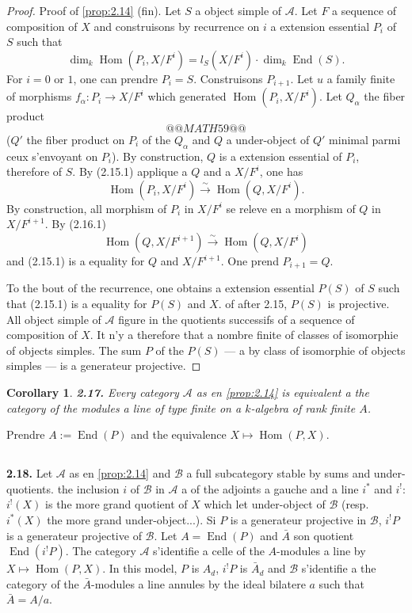 \documentclass[12pt,a4paper]{article}
\theoremstyle{plain}
\newtheorem{corollary}[theorem]{Corollary}
\theoremstyle{definition}
\theoremstyle{remark}
\DeclareMathOperator{\Hom}{Hom}
\DeclareMathOperator{\End}{End}
\begin{document}
\begin{proof}
Proof of \ref{prop:2.14} (fin). Let $S$ a object simple of $\mathcal{A}$. Let $F$ a sequence of composition of $X$ and construisons by recurrence on $i$ a extension essential $P_i$ of $S$ such that
\begin{equation}\label{eq:2.16.1}
\dim_k \Hom(P_i, X/F^i) = l_S(X/F^i) \cdot \dim_k \End(S).
\end{equation}
For $i = 0$ or $1$, one can prendre $P_i = S$. Construisons $P_{i+1}$. Let $u$ a family finite of morphisms $f_\alpha : P_i \to X/F^i$ which generated $\Hom(P_i, X/F^i)$. Let $Q_\alpha$ the fiber product
\[
@@MATH59@@
\]
($Q'$ the fiber product on $P_i$ of the $Q_\alpha$ and $Q$ a under-object of $Q'$ minimal parmi ceux s'envoyant on $P_i$). By construction, $Q$ is a extension essential of $P_i$, therefore of $S$. By (2.15.1) applique a $Q$ and a $X/F^i$, one has
\[
\Hom(P_i, X/F^i) \xrightarrow{\sim} \Hom(Q, X/F^i).
\]
By construction, all morphism of $P_i$ in $X/F^i$ se releve en a morphism of $Q$ in $X/F^{i+1}$. By (2.16.1)
\[
\Hom(Q, X/F^{i+1}) \xrightarrow{\sim} \Hom(Q, X/F^i)
\]
and (2.15.1) is a equality for $Q$ and $X/F^{i+1}$. One prend $P_{i+1} = Q$.

To the bout of the recurrence, one obtains a extension essential $P(S)$ of $S$ such that (2.15.1) is a equality for $P(S)$ and $X$. of after 2.15, $P(S)$ is projective. All object simple of $\mathcal{A}$ figure in the quotients successifs of a sequence of composition of $X$. It n'y a therefore that a nombre finite of classes of isomorphie of objects simples. The sum $P$ of the $P(S)$ --- a by class of isomorphie of objects simples --- is a generateur projective.
\end{proof}

\begin{corollary}\label{cor:2.17}
\textbf{2.17.} Every category $\mathcal{A}$ as en \ref{prop:2.14} is equivalent a the category of the modules a line of type finite on a $k$-algebra of rank finite $A$.
\end{corollary}

Prendre $A := \End(P)$ and the equivalence $X \mapsto \Hom(P,X)$.

\subsection{}

\textbf{2.18.} Let $\mathcal{A}$ as en \ref{prop:2.14} and $\mathcal{B}$ a full subcategory stable by sums and under-quotients. the inclusion $i$ of $\mathcal{B}$ in $\mathcal{A}$ a of the adjoints a gauche and a line $i^*$ and $i^!$: $i^!(X)$ is the more grand quotient of $X$ which let under-object of $\mathcal{B}$ (resp.~$i^*(X)$ the more grand under-object...). Si $P$ is a generateur projective in $\mathcal{B}$, $i^! P$ is a generateur projective of $\mathcal{B}$. Let $A = \End(P)$ and $\bar{A}$ son quotient $\End(i^! P)$. The category $\mathcal{A}$ s'identifie a celle of the $A$-modules a line by $X \mapsto \Hom(P,X)$. In this model, $P$ is $A_d$, $i^! P$ is $\bar{A}_d$ and $\mathcal{B}$ s'identifie a the category of the $\bar{A}$-modules a line annules by the ideal bilatere $a$ such that $\bar{A} = A/a$.
\end{document}

